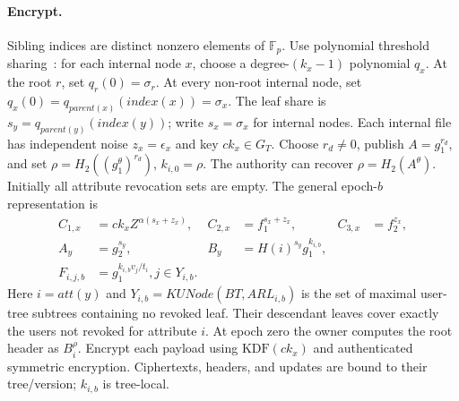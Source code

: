 \documentclass[runningheads]{llncs}
\newif\ifmarkrevisions
\newenvironment{revision}{\par\begingroup\ifmarkrevisions\color{RevisionBlue}\fi}{\par\endgroup}
\begin{document}
\begin{revision}
\paragraph{Encrypt.}
Sibling indices are distinct nonzero elements of $\mathbb F_p$.
Use polynomial threshold sharing~\cite{Shamir1979SecretSharing}:
for each internal node $x$, choose a degree-$(k_x-1)$ polynomial $q_x$.
At the root $r$, set $q_r(0)=\sigma_r$. At every non-root internal node, set
$q_x(0)=q_{parent(x)}(index(x))=\sigma_x$. The leaf share is
$s_y=q_{parent(y)}(index(y))$;
write $s_x=\sigma_x$ for internal nodes. Each internal file has independent
noise $z_x=\epsilon_x$ and key $ck_x\in G_T$. Choose $r_d\ne0$, publish
$A=g_1^{r_d}$, and set $\rho=H_2((g_1^\theta)^{r_d})$, $k_{i,0}=\rho$.
The authority can recover $\rho=H_2(A^\theta)$. Initially all attribute
revocation sets are empty. The general epoch-$b$ representation is
\begin{align}
 C_{1,x}&=ck_xZ^{\alpha(s_x+z_x)},& C_{2,x}&=f_1^{s_x+z_x},& C_{3,x}&=f_2^{z_x},\label{eq:files}\\
 A_y&=g_2^{s_y},& B_y&=H(i)^{s_y}g_1^{k_{i,b}},\nonumber\\
 F_{i,j,b}&=g_1^{k_{i,b}v_j/t_i},j\in Y_{i,b}.\label{eq:leaves}
\end{align}
Here $i=att(y)$ and $Y_{i,b}=KUNode(BT,ARL_{i,b})$ is the set of maximal
user-tree subtrees containing no revoked leaf. Their descendant leaves cover
exactly the users not revoked for attribute $i$. At epoch zero the
owner computes the root header as $B_i^\rho$. Encrypt each payload using
$\mathrm{KDF}(ck_x)$ and authenticated symmetric encryption. Ciphertexts,
headers, and updates are bound to their tree/version; $k_{i,b}$ is tree-local.


\end{revision}
\end{document}
